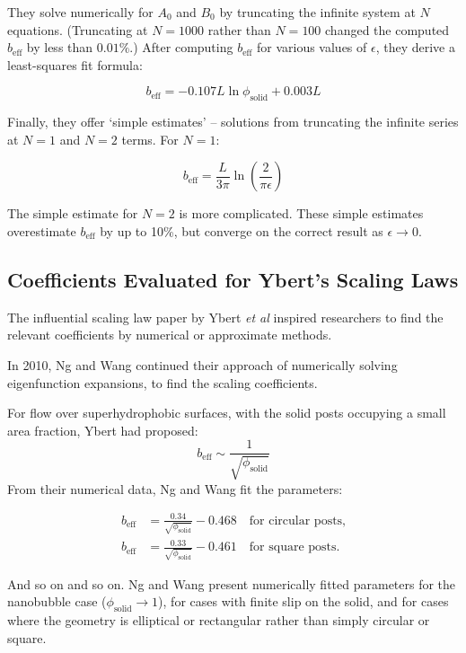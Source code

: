 \documentclass[a4paper]{report}
\newcommand{\beff}{\ensuremath{b_{\mathrm{eff}}}}
\newcommand{\phisol}{\ensuremath{\phi_{\mathrm{solid}}}}
\begin{document}
They solve numerically for $A_0$ and $B_0$ by truncating the infinite system at $N$ equations.  (Truncating at $N=1000$ rather than $N=100$ changed the computed $\beff$ by less than $0.01\%$.) After computing $\beff$ for various values of $\epsilon$, they derive a least-squares fit formula:

\begin{equation*}
\beff = -0.107 L \ln \phisol + 0.003L
\end{equation*}

Finally, they offer `simple estimates' -- solutions from truncating the infinite series at $N=1$ and $N=2$ terms. For $N=1$:

\begin{equation*}
\beff = \frac{L}{3\pi} \ln \left( \frac{2}{\pi \epsilon} \right)
\end{equation*}

The simple estimate for $N=2$ is more complicated.  These simple estimates overestimate $\beff$ by up to 10\%, but converge on the correct result as $\epsilon \rightarrow 0$.

\subsection*{Coefficients Evaluated for Ybert's Scaling Laws}

The influential scaling law paper by Ybert \emph{et al} \cite{Ybert2007} inspired researchers to find the relevant coefficients by numerical or approximate methods.

In 2010, Ng and Wang \cite{NgWang2010} continued their approach of numerically solving eigenfunction expansions, to find the scaling coefficients.

For flow over superhydrophobic surfaces, with the solid posts occupying a small area fraction, Ybert had proposed:
\begin{equation*}
\beff \sim \frac{1}{\sqrt{\phisol}}
\end{equation*}
From their numerical data, Ng and Wang fit the parameters:

\begin{align*}
\beff &= \frac{0.34}{\sqrt{\phisol}} - 0.468 \quad \text{for circular posts,} \\
\beff &= \frac{0.33}{\sqrt{\phisol}} - 0.461 \quad \text{for square posts.}
\end{align*}

And so on and so on.  Ng and Wang present numerically fitted parameters for the nanobubble case ($\phisol \rightarrow 1$), for cases with finite slip on the solid, and for cases where the geometry is elliptical or rectangular rather than simply circular or square.
\end{document}
